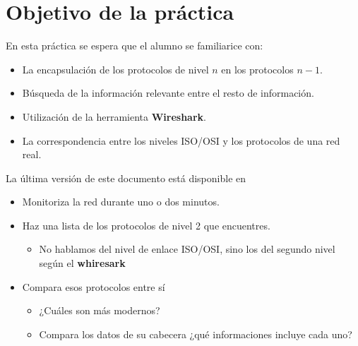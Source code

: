 

\renewcommand{\hmwkTitle}{Análisis de tráfico con \textbf{Wireshark}}

\renewcommand{\hmwkClass}{Plan. y Admin. de Redes}




\primerapagina


\section{Objetivo de la práctica}
En esta práctica se espera que el alumno se familiarice con:
\begin{itemize}
\item La encapsulación de los protocolos de nivel $n$ en los protocolos $n-1$.
\item Búsqueda de la información relevante entre el resto de información.
\item Utilización de la herramienta \textbf{Wireshark}.
\item La correspondencia entre los niveles ISO/OSI y los protocolos de una red real.
  
\end{itemize}

La última versión de este documento está disponible en 

\begin{homeworkProblem}

  \begin{itemize}
  \item Monitoriza la red durante uno o dos minutos. 
  \item Haz una lista de los protocolos de nivel 2 que encuentres.
    \begin{itemize}
    \item \small{No hablamos del nivel de enlace ISO/OSI, sino los del segundo nivel según el \textbf{whiresark}}
    \end{itemize}
  \item Compara esos protocolos entre sí
    \begin{itemize}
    \item ¿Cuáles son más modernos?
    \item Compara los datos de su cabecera ¿qué informaciones incluye cada uno?
    \end{itemize}
  \end{itemize}
  
\end{homeworkProblem}

